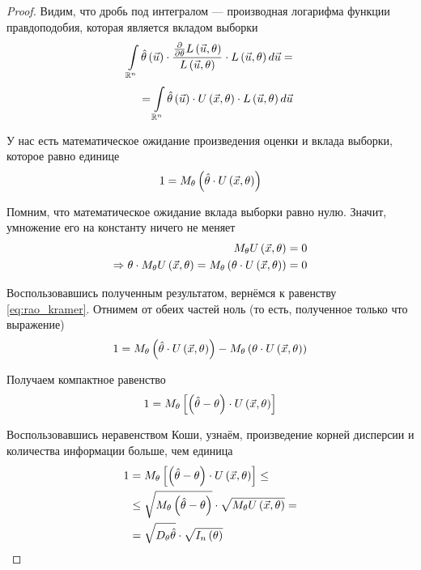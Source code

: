 \begin{proof}
    Видим, что дробь под интегралом --- производная логарифма
    функции правдоподобия, которая является вкладом выборки
    \begin{align*}
    \integral{\mathbb{R}^n}{}{\vec{u}}{\hat{\theta}\left( \vec{u} \right)
        \cdot \frac{
            \frac{\partial}{\partial \theta}L\left( \vec{u},\theta \right)}
            {L\left( \vec{u},\theta \right)}
                \cdot L\left( \vec{u},\theta \right)}=\\
        =\integral{\mathbb{R}^n}{}{\vec{u}}{\hat{\theta}\left( \vec{u} \right)
            \cdot
                U\left( \vec{x},\theta \right)
                    \cdot L\left( \vec{u},\theta \right)}
    \end{align*}

    У нас есть математическое ожидание произведения оценки и вклада выборки,
    которое равно единице
    \begin{equation}\label{eq:rao_kramer}
        1=\meanof{\theta}{
            \left(\hat{\theta}\cdot U\left( \vec{x},\theta \right)\right)}
    \end{equation}

    Помним, что математическое ожидание вклада выборки равно нулю.
    Значит, умножение его на константу ничего не меняет
    \begin{align*}
        \meanof{\theta}{U\left( \vec{x},\theta \right)}=0\\
        \Rightarrow 
        \theta\cdot\meanof{\theta}{U\left( \vec{x},\theta \right)}
        =\meanof{\theta}{\left(\theta\cdot U\left(\vec{x},\theta\right)\right)}
        =0
    \end{align*}

    Воспользовавшись полученным результатом,
    вернёмся к равенству \eqref{eq:rao_kramer}.
    Отнимем от обеих частей ноль (то есть, полученное только что выражение)
    $$1=\meanof{\theta}{
            \left(\hat{\theta}\cdot U\left( \vec{x},\theta \right)\right)}
        -\meanof{\theta}{
            \left(\theta\cdot U\left(\vec{x},\theta\right)\right)}$$

    Получаем компактное равенство
    $$1=\meanof{\theta}{
            \left[\left(\hat{\theta}-\theta\right)
                \cdot U\left( \vec{x},\theta \right)\right]}$$

    Воспользовавшись неравенством Коши, узнаём,
    произведение корней дисперсии и количества информации больше, чем единица
    \begin{equation}\label{eq:rao_kramer_koshi}
        \begin{split}
        1&=\meanof{\theta}{
            \left[\left(\hat{\theta}-\theta\right)
                \cdot U\left( \vec{x},\theta \right)\right]}\le\\
        &\le\sqrt{\meanof{\theta}{
            \left(\hat{\theta}-\theta\right)}}
            \cdot\sqrt{\meanof{\theta}{U\left( \vec{x},\theta \right)}}=\\
        &=\sqrt{\dispersionof{\theta}{\hat{\theta}}}
            \cdot\sqrt{I_n\left(\theta\right)}
        \end{split}
    \end{equation}


\end{proof}
